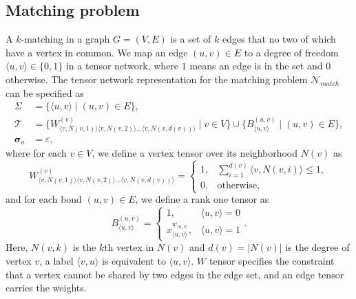 \documentclass[review, onefignum, onetabnum]{siamart190516}
\begin{document}
\subsection{Matching problem}
A $k$-matching in a graph $G=(V,E)$ is a set of $k$ edges that no two of which have a vertex in common.
We map an edge $(u, v) \in E$ to a degree of freedom $\langle u, v\rangle \in \{0, 1\}$ in a tensor network, where $1$ means an edge is in the set and $0$ otherwise.
The tensor network representation for the matching problem $\mathcal{N}_{match}$ can be specified as
\begin{equation}\label{eq:matchtensornetwork}
\begin{split}
    \Sigma &= \{\langle u,v\rangle \mid (u, v) \in E\},\\
    \mathcal{T} &= \{W^{(v)}_{\langle v, N(v, 1)\rangle \langle v, N(v,2) \rangle \ldots \langle v, N(v, d(v))\rangle} \mid v\in V\} \cup \{B^{(u, v)}_{\langle u,v\rangle} \mid (u, v) \in E\},\\
    \boldsymbol{\sigma}_o &= \varepsilon,
\end{split}
\end{equation}
where for each $v\in V$, we define a vertex tensor over its neighborhood $N(v)$ as
\begin{equation}
    W^{(v)}_{\langle v, N(v, 1)\rangle \langle v, N(v, 2) \rangle \ldots \langle v, N(v,d(v))\rangle} = \begin{cases}
        1, & \sum_{i=1}^{d(v)} \langle v, N(v, i) \rangle \leq 1,\\
        0, & \text{otherwise},
    \end{cases}
\end{equation}
and for each bond $(u, v) \in E$, we define a rank one tensor as
\begin{equation}
    B^{(u, v)}_{\langle u, v\rangle} = \begin{cases}
    1, & \langle u, v \rangle = 0 \\
    x^{w_{\langle u,v \rangle}}_{\langle u, v\rangle}, & \langle u, v \rangle = 1
\end{cases}.
\end{equation}
Here, $N(v, k)$ is the $k$th vertex in $N(v)$ and $d(v) = |N(v)|$ is the degree of vertex $v$, a label $\langle v, u \rangle$ is equivalent to $\langle u,v\rangle$.
$W$ tensor specifies the constraint that a vertex cannot be shared by two edges in the edge set, and an edge tensor carries the weights.
\end{document}
